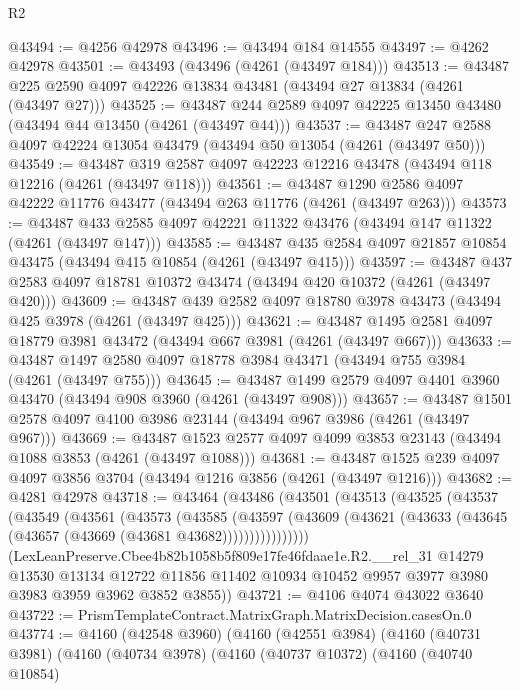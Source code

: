 \begin{lexlean}{R2}
\begin{coremodule}
@43494 := @4256 @42978
@43496 := @43494 @184 @14555
@43497 := @4262 @42978
@43501 := @43493 (@43496 (@4261 (@43497 @184)))
@43513 := @43487 @225 @2590 @4097 @42226 @13834 @43481 (@43494 @27 @13834 (@4261 (@43497 @27)))
@43525 := @43487 @244 @2589 @4097 @42225 @13450 @43480 (@43494 @44 @13450 (@4261 (@43497 @44)))
@43537 := @43487 @247 @2588 @4097 @42224 @13054 @43479 (@43494 @50 @13054 (@4261 (@43497 @50)))
@43549 := @43487 @319 @2587 @4097 @42223 @12216 @43478 (@43494 @118 @12216 (@4261 (@43497 @118)))
@43561 := @43487 @1290 @2586 @4097 @42222 @11776 @43477 (@43494 @263 @11776 (@4261 (@43497 @263)))
@43573 := @43487 @433 @2585 @4097 @42221 @11322 @43476 (@43494 @147 @11322 (@4261 (@43497 @147)))
@43585 := @43487 @435 @2584 @4097 @21857 @10854 @43475 (@43494 @415 @10854 (@4261 (@43497 @415)))
@43597 := @43487 @437 @2583 @4097 @18781 @10372 @43474 (@43494 @420 @10372 (@4261 (@43497 @420)))
@43609 := @43487 @439 @2582 @4097 @18780 @3978 @43473 (@43494 @425 @3978 (@4261 (@43497 @425)))
@43621 := @43487 @1495 @2581 @4097 @18779 @3981 @43472 (@43494 @667 @3981 (@4261 (@43497 @667)))
@43633 := @43487 @1497 @2580 @4097 @18778 @3984 @43471 (@43494 @755 @3984 (@4261 (@43497 @755)))
@43645 := @43487 @1499 @2579 @4097 @4401 @3960 @43470 (@43494 @908 @3960 (@4261 (@43497 @908)))
@43657 := @43487 @1501 @2578 @4097 @4100 @3986 @23144 (@43494 @967 @3986 (@4261 (@43497 @967)))
@43669 := @43487 @1523 @2577 @4097 @4099 @3853 @23143 (@43494 @1088 @3853 (@4261 (@43497 @1088)))
@43681 := @43487 @1525 @239 @4097 @4097 @3856 @3704 (@43494 @1216 @3856 (@4261 (@43497 @1216)))
@43682 := @4281 @42978
@43718 := @43464
    (@43486
      (@43501
        (@43513
          (@43525
            (@43537
              (@43549
                (@43561
                  (@43573
                    (@43585
                      (@43597
                        (@43609
                          (@43621 (@43633 (@43645 (@43657 (@43669 (@43681 @43682))))))))))))))))
      (LexLeanPreserve.Cbee4b82b1058b5f809e17fe46fdaae1e.R2.__rel_31
        @14279
        @13530
        @13134
        @12722
        @11856
        @11402
        @10934
        @10452
        @9957
        @3977
        @3980
        @3983
        @3959
        @3962
        @3852
        @3855))
@43721 := @4106 @4074 @43022 @3640
@43722 := PrismTemplateContract.MatrixGraph.MatrixDecision.casesOn.{0}
@43774 := @4160
    (@42548 @3960)
    (@4160
      (@42551 @3984)
      (@4160
        (@40731 @3981)
        (@4160
          (@40734 @3978)
          (@4160
            (@40737 @10372)
            (@4160
              (@40740 @10854)

\end{coremodule}
\end{lexlean}
